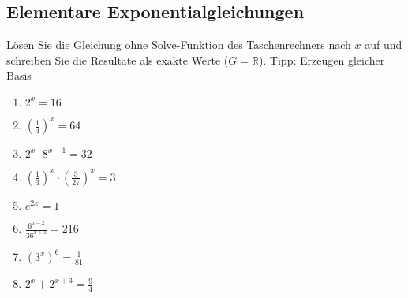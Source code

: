   \subsection{Elementare Exponentialgleichungen}
Lösen Sie die Gleichung ohne Solve-Funktion des Taschenrechners nach
$x$ auf und schreiben Sie die Resultate als exakte Werte ($G =
\mathbb{R}$).
Tipp: Erzeugen gleicher Basis

\begin{multicols}{3}
\begin{enumerate}
\item $2^x=16$
\item $\left(\frac{1}{4}\right)^x = 64$
\item $2^x\cdot 8^{x-1} = 32$
  \item $\left(\frac{1}{3}\right)^x\cdot \left(\frac{3}{27}\right)^x = 3$
  \item $e^{2x}=1$
  \item $\frac{6^{x-2}}{36^{x+1}} = 216$
  \item $\left(3^x\right)^6=\frac{1}{81}$
    \item $2^x + 2^{x+3} = \frac{9}{4}$
  \end{enumerate}
\end{multicols}
